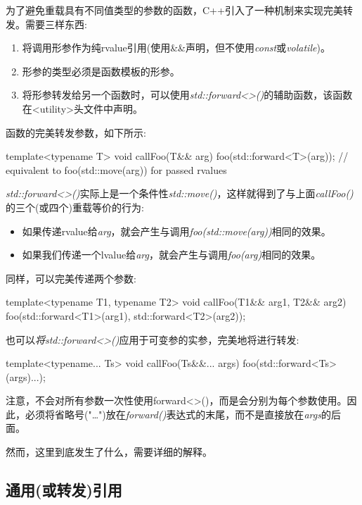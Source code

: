 为了避免重载具有不同值类型的参数的函数，C++引入了一种机制来实现完美转发。需要三样东西:

\begin{enumerate}
	\item 将调用形参作为纯rvalue引用(使用\&\&声明，但不使用\textit{const}或\textit{volatile})。
	\item 形参的类型必须是函数模板的形参。
	\item 将形参转发给另一个函数时，可以使用\textit{std::forward<>()}的辅助函数，该函数在<utility>头文件中声明。
\end{enumerate}

函数的完美转发参数，如下所示:

\begin{cppcode}
template<typename T>
void callFoo(T&& arg) {
	foo(std::forward<T>(arg)); // equivalent to foo(std::move(arg)) for passed rvalues
}
\end{cppcode}

\textit{std::forward<>()}实际上是一个条件性\textit{std::move()}，这样就得到了与上面\textit{callFoo()}的三个(或四个)重载等价的行为:

\begin{itemize}
	\item 如果传递rvalue给\textit{arg}，就会产生与调用\textit{foo(std::move(arg))}相同的效果。
	\item 如果我们传递一个lvalue给\textit{arg}，就会产生与调用\textit{foo(arg)}相同的效果。
\end{itemize}

同样，可以完美传递两个参数:

\begin{cppcode}
template<typename T1, typename T2>
void callFoo(T1&& arg1, T2&& arg2) {
	foo(std::forward<T1>(arg1), std::forward<T2>(arg2));
}
\end{cppcode}

也可以\textit{将std::forward<>()}应用于可变参的实参，完美地将进行转发:

\begin{cppcode}
template<typename... Ts>
void callFoo(Ts&&... args) {
	foo(std::forward<Ts>(args)...);
}
\end{cppcode}

注意，不会对所有参数一次性使用forward<>()，而是会分别为每个参数使用。因此，必须将省略号("…")放在\textit{forward()}表达式的末尾，而不是直接放在\textit{args}的后面。

然而，这里到底发生了什么，需要详细的解释。

\subsection{通用(或转发)引用}

